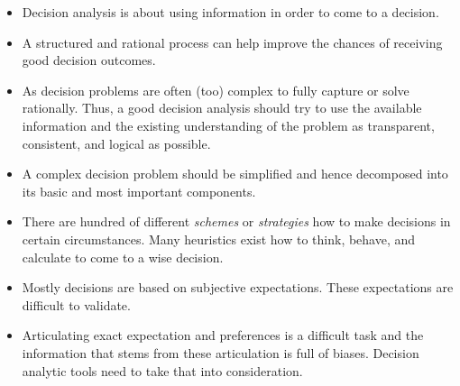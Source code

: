 \documentclass[
  12pt,
  oneside]{book}
\providecommand{\tightlist}{%
  \setlength{\itemsep}{0pt}\setlength{\parskip}{0pt}}
\theoremstyle{definition}
\theoremstyle{definition}
\theoremstyle{definition}
\theoremstyle{definition}
\theoremstyle{remark}
\begin{document}
\begin{itemize}
\tightlist
\item
  Decision analysis is about using information in order to come to a decision.
\item
  A structured and rational process can help improve the chances of receiving good decision outcomes.
\item
  As decision problems are often (too) complex to fully capture or solve rationally. Thus, a good decision analysis should try to use the available information and the existing understanding of the problem as transparent, consistent, and logical as possible.
\item
  A complex decision problem should be simplified and hence decomposed into its basic and most important components.
\item
  There are hundred of different \emph{schemes} or \emph{strategies} how to make decisions in certain circumstances. Many heuristics exist how to think, behave, and calculate to come to a wise decision.
\item
  Mostly decisions are based on subjective expectations. These expectations are difficult to validate.
\item
  Articulating exact expectation and preferences is a difficult task and the information that stems from these articulation is full of biases. Decision analytic tools need to take that into consideration.
\end{itemize}
\end{document}
